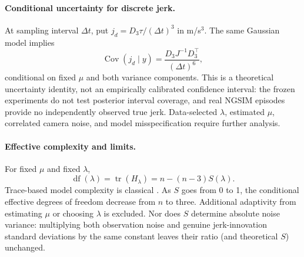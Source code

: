 \paragraph{Conditional uncertainty for discrete jerk.}
At sampling interval $\Delta t$, put
$j_d=D_3\tau/(\Delta t)^3$ in m/s$^3$.
The same Gaussian model implies
\begin{equation}\label{eq:jerk-conditional-covariance}
\operatorname{Cov}(j_d\mid y)
=\frac{D_3J^{-1}D_3^\top}{(\Delta t)^6},
\end{equation}
conditional on fixed $\mu$ and both
variance components. This is a theoretical
uncertainty identity, not an empirically
calibrated confidence interval: the
frozen experiments do not test posterior
interval coverage, and real NGSIM episodes
provide no independently observed true jerk.
Data-selected $\lambda$, estimated $\mu$,
correlated camera noise, and model
misspecification require further analysis.

\paragraph{Effective complexity and limits.}
For fixed $\mu$ and fixed $\lambda$,
\begin{equation}\label{eq:edf}
\operatorname{df}(\lambda)
=\operatorname{tr}(H_\lambda)
=n-(n-3)S(\lambda).
\end{equation}
Trace-based model complexity is classical
\citep{efron2004,ye1998}. As $S$ goes
from 0 to 1, the conditional effective
degrees of freedom decrease from $n$ to
three. Additional adaptivity from estimating
$\mu$ or choosing $\lambda$ is excluded.
Nor does $S$ determine absolute noise
variance: multiplying both observation
noise and genuine jerk-innovation standard
deviations by the same constant leaves
their ratio (and theoretical $S$) unchanged.

